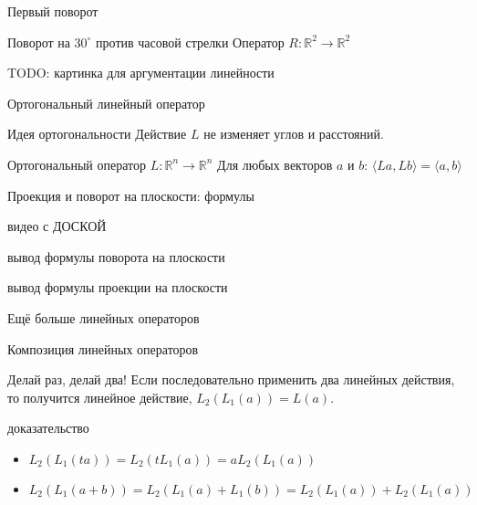 \documentclass[14pt,xcolor=dvipsnames]{beamer}
\newcommand\R{\mathbb{R}}
\begin{document}
\begin{frame}{Первый поворот}

\begin{block}{Поворот на $30^{\circ}$ против часовой стрелки}
Оператор $R: \R^2 \to \R^2$ 

TODO: картинка для аргументации линейности
\end{block}

\end{frame}
  
\begin{frame}{Ортогональный линейный оператор}

\begin{block}{Идея ортогональности}
  Действие $L$ не изменяет углов и расстояний. 
\end{block}


\begin{block}{Ортогональный оператор $L : \R^n \to \R^n$}
 Для любых векторов $a$ и $b$: $\langle La, Lb \rangle = \langle a, b\rangle$
\end{block}



\end{frame}
  

\begin{frame} %
  Проекция и поворот на плоскости: формулы
\end{frame}

  
\begin{frame}{видео с ДОСКОЙ}

\begin{block}{вывод формулы поворота на плоскости}
\end{block}

\begin{block}{вывод формулы проекции на плоскости}
\end{block}


\end{frame}
  
\begin{frame} %
  Ещё больше линейных операторов
\end{frame}

\begin{frame}{Композиция линейных операторов}

\begin{block}{Делай раз, делай два!}
Если последовательно применить два линейных действия, то получится линейное действие, $L_2 (L_1 (a)) = L(a)$.
\end{block}

\begin{block}{доказательство}
  \begin{itemize}
    \item $L_2 (L_1 (t a)) = L_2 (t L_1 (a)) = a L_2(L_1(a))$
    \item $L_2 (L_1 (a + b)) = L_2 (L_1 (a) + L_1(b)) = L_2(L_1(a)) + L_2(L_1(a))$
  \end{itemize}
\end{block}

\end{frame}
\end{document}
